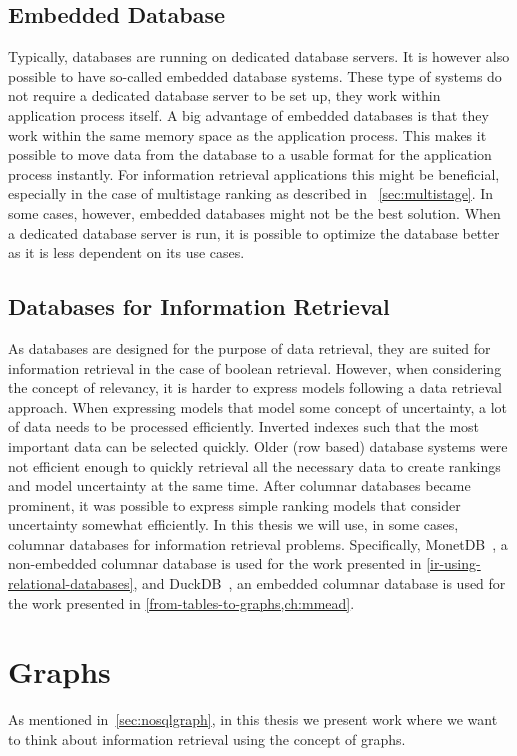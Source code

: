 \subsection{Embedded Database}
Typically, databases are running on dedicated database servers. It is however also possible to have so-called embedded database systems. These type of systems do not require a dedicated database server to be set up, they work within application process itself. A big advantage of embedded databases is that they work within the same memory space as the application process. This makes it possible to move data from the database to a usable format for the application process instantly. For information retrieval applications this might be beneficial, especially in the case of multistage ranking as described in ~\cref{sec:multistage}. In some cases, however, embedded databases might not be the best solution. When a dedicated database server is run, it is possible to optimize the database better as it is less dependent on its use cases. 

\subsection{Databases for Information Retrieval}
As databases are designed for the purpose of data retrieval, they are suited for information retrieval in the case of boolean retrieval. However, when considering the concept of relevancy, it is harder to express models following a data retrieval approach. When expressing models that model some concept of uncertainty, a lot of data needs to be processed efficiently. Inverted indexes such that the most important data can be selected quickly. Older (row based) database systems were not efficient enough to quickly retrieval all the necessary data to create rankings and model uncertainty at the same time. After columnar databases became prominent, it was possible to express simple ranking models that consider uncertainty somewhat efficiently. In this thesis we will use, in some cases, columnar databases for information retrieval problems. Specifically, MonetDB~\cite{monet}, a non-embedded columnar database is used for the work presented in \cref{ir-using-relational-databases}, and DuckDB~\cite{duckdb}, an embedded columnar database is used for the work presented in \cref{from-tables-to-graphs,ch:mmead}.

\section{Graphs}
\label{sec:graphs}
As mentioned in~\cref{sec:nosqlgraph}, in this thesis we present work where we want to think about information retrieval using the concept of graphs.

